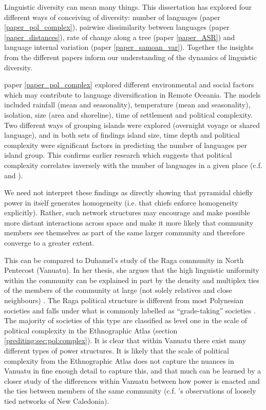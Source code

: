 \documentclass[a4paper,10pt]{article} %
\begin{document}
\newpage


Linguistic diversity can mean many things. This dissertation has explored four different ways of conceiving of diversity: number of languages (paper \ref{paper_pol_complex}), pairwise dissimilarity between languages (paper \ref{paper_distances}), rate of change along a tree (paper \ref{paper_ASR}) and language internal variation (paper \ref{paper_samoan_var}). Together the insights from the different papers inform our understanding of the dynamics of linguistic diversity.

paper \ref{paper_pol_complex} explored different environmental and social factors which may contribute to language diversification in Remote Oceania. The models included rainfall (mean and seasonality), temperature (mean and seasonality), isolation, size (area and shoreline), time of settlement and political complexity. Two different ways of grouping islands were explored (overnight voyage or shared language), and in both sets of findings island size, time depth and political complexity were significant factors in predicting the number of languages per island group. This confirms earlier research which suggests that political complexity correlates inversely with the number of languages in a given place (c.f. \cite{pawley2007} and \cite{curriemace2009}). 

We need not interpret these findings as directly showing that pyramidal chiefly power in itself generates homogeneity (i.e. that chiefs enforce homogeneity explicitly). Rather, such network structures may encourage and make possible more distant interactions across space and make it more likely that community members see themselves as part of the same larger community and therefore converge to a greater extent. 

This can be compared to Duhamel's study of the Raga community in North Pentecost (Vanuatu). In her thesis, she argues that the high linguistic uniformity within the community can be explained in part by the density and multiplex ties of the members of the community at large (not solely relatives and close neighbours) \citep{duhamel2020raga}. The Raga political structure is different from most Polynesian societies and falls under what is commonly labelled as ``grade-taking'' societies \citep{bonnemaison1996graded}. The majority of societies of this type are classified as level one in the scale of political complexity in the Ethnographic Atlas (section \ref{prediting:sec:pol:complex}). It is clear that within Vanuatu there exist many different types of power structures. It is likely that the scale of political complexity from the Ethnographic Atlas does not capture the nuances in Vanuatu in fine enough detail to capture this, and that much can be learned by a closer study of the differences within Vanuatu between how power is enacted and the ties between members of the same community (c.f. \cite{grace_1992_aberrant}'s observations of loosely tied networks of New Caledonia).
\end{document}

